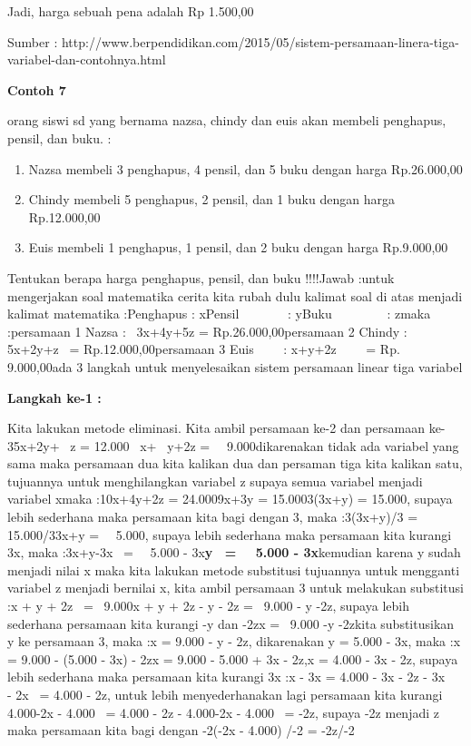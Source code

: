 \documentclass[11pt,fleqn]{book} %
\begin{document}
\noindent 

\noindent Jadi, harga sebuah pena adalah Rp 1.500,00

\noindent Sumber : http://www.berpendidikan.com/2015/05/sistem-persamaan-linera-tiga-variabel-dan-contohnya.html

\noindent 

\noindent \textbf{Contoh 7 }

 orang siswi sd yang bernama nazsa, chindy dan euis akan membeli penghapus, pensil, dan buku. :

\begin{enumerate}
\item  Nazsa membeli 3 penghapus, 4 pensil, dan 5 buku dengan harga Rp.26.000,00

\item  Chindy membeli 5 penghapus, 2 pensil, dan 1 buku dengan harga Rp.12.000,00

\item  Euis membeli 1 penghapus, 1 pensil, dan 2 buku dengan harga Rp.9.000,00
\end{enumerate}

\noindent Tentukan berapa harga penghapus, pensil, dan buku !!!!Jawab :untuk mengerjakan soal matematika cerita kita rubah dulu kalimat soal di atas menjadi kalimat matematika :Penghapus : xPensil~~~~~~~ : yBuku~~~~~~~~ : zmaka :persamaan 1 Nazsa :~ 3x+4y+5z = Rp.26.000,00persamaan 2 Chindy : 5x+2y+z~ = Rp.12.000,00persamaan 3 Euis~~~~ : x+y+2z~~~~ = Rp.~ 9.000,00ada 3 langkah untuk menyelesaikan sistem persamaan linear tiga variabel

\noindent \textbf{Langkah ke-1 :}

\noindent Kita lakukan metode eliminasi. Kita ambil persamaan ke-2 dan persamaan ke-35x+2y+~ z = 12.000~ x+~ y+2z =~~ 9.000dikarenakan tidak ada variabel yang sama maka persamaan dua kita kalikan dua dan persaman tiga kita kalikan satu, tujuannya untuk menghilangkan variabel z supaya semua variabel menjadi variabel xmaka :10x+4y+2z = 24.0009x+3y = 15.0003(3x+y) = 15.000, supaya lebih sederhana maka persamaan kita bagi dengan 3, maka :3(3x+y)/3 = 15.000/33x+y =~~ 5.000, supaya lebih sederhana maka persamaan kita kurangi 3x, maka :3x+y-3x~ =~~ 5.000 - 3x\textbf{y~ =~~ 5.000 - 3x}kemudian karena y sudah menjadi nilai x maka kita lakukan metode substitusi tujuannya untuk mengganti variabel z menjadi bernilai x, kita ambil persamaan 3 untuk melakukan substitusi :x + y + 2z~ =~ 9.000x + y + 2z - y - 2z =~ 9.000 - y -2z, supaya lebih sederhana persamaan kita kurangi -y dan -2zx =~ 9.000 -y -2zkita substitusikan y ke persamaan 3, maka :x = 9.000 - y - 2z, dikarenakan y = 5.000 - 3x, maka :x = 9.000 - (5.000 - 3x) - 2zx = 9.000 - 5.000 + 3x - 2z,x = 4.000 - 3x - 2z, supaya lebih sederhana maka persamaan kita kurangi 3x :x - 3x = 4.000 - 3x - 2z - 3x~~ - 2x~ = 4.000 - 2z, untuk lebih menyederhanakan lagi persamaan kita kurangi~ 4.000-2x - 4.000~ = 4.000 - 2z - 4.000-2x - 4.000~ = -2z, supaya -2z menjadi z maka persamaan kita bagi dengan -2(-2x - 4.000) /-2 = -2z/-2
\end{document}
